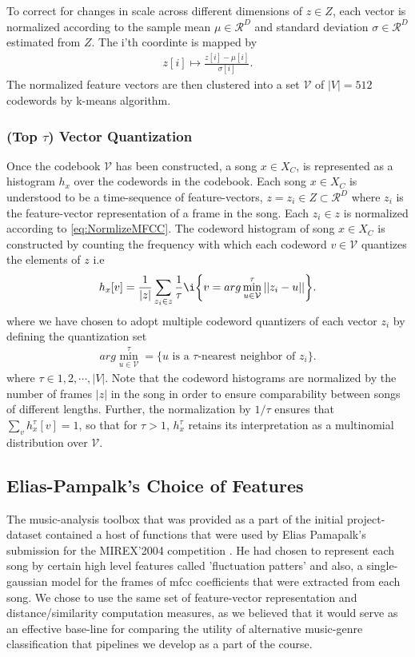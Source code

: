 \documentclass[10pt]{article}
\begin{document}
To correct for changes in scale across different dimensions of $ z \in Z$, each vector is normalized according to the sample mean $\mu \in \mathcal{R}^D$ and standard deviation $\sigma \in \mathcal{R}^D$ estimated from $Z$. The i'th coordinte is mapped by
\begin{align}
z[i] \mapsto \frac{z[i] - \mu[i]}{\sigma[i]}. \label{eq:NormlizeMFCC}
\end{align}The normalized feature vectors are then clustered into a set $\mathcal{V}$ of $|V| = 512$ codewords by k-means algorithm.

\subsubsection{(Top $\tau$) Vector Quantization}
Once the codebook $\mathcal{V}$ has been constructed, a song $x \in X_C$, is represented as a histogram $h_x$ over the codewords in the codebook. Each song $x \in X_C$ is understood to be a time-sequence of feature-vectors, $ z = {z_i} \in Z \subset \mathcal{R}^D$ where $z_i$ is the feature-vector representation of a frame in the song. Each $ z_i \in z$ is normalized according to \eqref{eq:NormlizeMFCC}. The codeword histogram of song $x \in X_C$ is constructed by counting the frequency with which each codeword $v \in \mathcal{V}$ quantizes the elements of $z$ i.e
\begin{align}
h_x[v] = \frac{1}{|z|} \sum_{z_i \in z} \frac{1}{\tau}\i\bigg\lbrace v = arg\min_{u \in \mathcal{V}}^{\tau}||z_i - u|| \bigg\rbrace. \label{eq:wc_Hist_Defn}
\end{align}
where we have chosen to adopt multiple codeword quantizers of each vector $z_i$ by defining the quantization set
\begin{align}
arg\min_{u \in \mathcal{V}}^{\tau} = \big\lbrace u \text{ is a } \tau \text{-nearest neighbor of }z_i \big\rbrace. \label{eq:TauQuantize}
\end{align}
where $\tau \in {1,2,\cdots, |V|}.$
Note that the codeword histograms are normalized by the number of frames $|z|$ in the song in order to ensure comparability between songs of different lengths. Further, the normalization by $1/\tau$ ensures that $\sum_v h_x^{\tau}[v] = 1$, so that for $\tau > 1$, $h_x^{\tau}$ retains its interpretation as a multinomial distribution over $\mathcal{V}$.


\subsection{Elias-Pampalk's Choice of Features}
The music-analysis toolbox that was provided as a part of the initial project-dataset contained a host of functions that were used by Elias Pamapalk's submission for the MIREX'2004 competition \cite{eliaspam}. He had chosen to represent each song by certain high level features called 'fluctuation patters' and also, a single-gaussian model for the frames of mfcc coefficients that were extracted from each song. 
We chose to use the same set of feature-vector representation and distance/similarity computation measures, as we believed that it would serve as an effective base-line for comparing the utility of alternative music-genre classification that pipelines we develop as a part of the course. 
\end{document}
